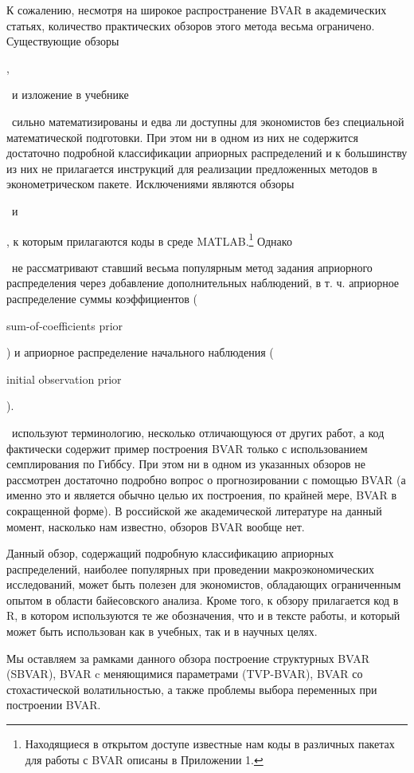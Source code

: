 \documentclass[11pt]{article} %
\newcommand{\eng}[1]{\begin{otherlanguage}{english}#1\end{otherlanguage}}
\begin{document}
К сожалению, несмотря на широкое распространение BVAR в академических статьях, количество практических обзоров этого метода  весьма ограничено. Существующие обзоры \eng{\cite{karlsson_2012}}, \eng{\cite{delnegro_schorfheide_2011}}~и изложение в учебнике \eng{\cite{canova_2007}}~сильно математизированы и едва ли доступны для экономистов без специальной математической подготовки.
 При этом ни в одном из них не содержится достаточно подробной классификации априорных распределений и к большинству из них не прилагается инструкций для реализации предложенных методов в эконометрическом пакете.
Исключениями являются обзоры \eng{\cite{koop_korobilis_2010}}~и \eng{\cite{blake_mumtaz_2012}}, к которым прилагаются коды в среде MATLAB.\footnote{Находящиеся в открытом доступе известные нам коды в различных пакетах для работы с BVAR описаны в Приложении 1.}
Однако \eng{\cite{koop_korobilis_2010}}~не рассматривают ставший весьма популярным метод задания априорного распределения через добавление дополнительных наблюдений, в т. ч. априорное распределение суммы коэффициентов (\eng{sum-of-coefficients prior}) и априорное распределение начального наблюдения (\eng{initial observation prior}).
\eng{\cite{blake_mumtaz_2012}}~используют терминологию, несколько отличающуюся от других работ, а код фактически содержит  пример построения BVAR только с использованием семплирования по Гиббсу. При этом ни в одном из указанных обзоров не рассмотрен достаточно подробно вопрос о прогнозировании с помощью BVAR (а именно это и является обычно целью их построения, по крайней мере, BVAR в сокращенной форме). В российской же академической литературе на данный момент, насколько нам известно, обзоров BVAR вообще нет.

Данный обзор, содержащий подробную классификацию априорных распределений, наиболее популярных при проведении макроэкономических исследований, может быть полезен для экономистов, обладающих ограниченным опытом в области байесовского анализа. Кроме того, к обзору прилагается код в R, в котором используются те же обозначения, что и в тексте работы, и который может быть использован как в учебных, так и в научных целях.

Мы оставляем за рамками данного обзора построение структурных BVAR (SBVAR), BVAR c меняющимися параметрами (TVP-BVAR), BVAR со стохастической волатильностью, а также проблемы выбора переменных при построении BVAR. %
\end{document}

